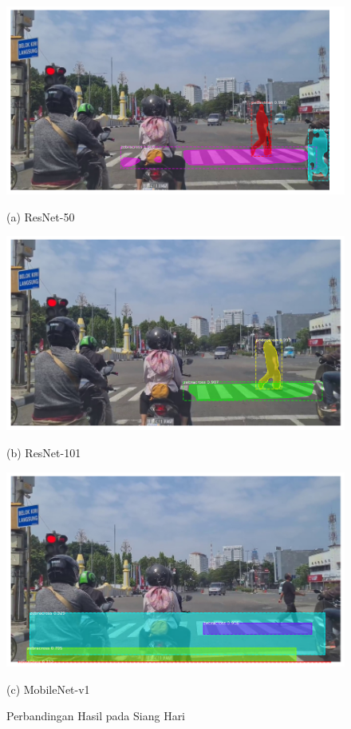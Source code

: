 \begin{figure}[!h]
	\centering
	\begin{minipage}[b]{0.3\textwidth}
		\includegraphics[width=\textwidth]{gambar/hasil/resnet-50_siang_465.png}
		\caption*{(a) ResNet-50}
	\end{minipage}
	\hfill
	\begin{minipage}[b]{0.3\textwidth}
		\includegraphics[width=\textwidth]{gambar/hasil/resnet-101_siang_465.png}
		\caption*{(b) ResNet-101}
	\end{minipage}
	\hfill
	\begin{minipage}[b]{0.3\textwidth}
		\includegraphics[width=\textwidth]{gambar/siang-frame465-mobilenetv1.png}
		\caption*{(c) MobileNet-v1}
	\end{minipage}
	\caption{{Perbandingan Hasil pada Siang Hari}}
	\label{fig:comparasion-afternoon}
\end{figure}


